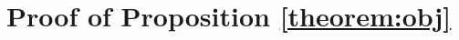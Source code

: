 \documentclass[a4paper,10pt]{article}
\theoremstyle{plain}
\begin{document}
	
	\renewcommand{\refname}{\normalsize References}\small
	
	
	
	\appendix
	
	
	\section{}
	\label{proof_bipartite}
	\section*{Proof of Proposition \ref{theorem:obj}}
\end{document}

